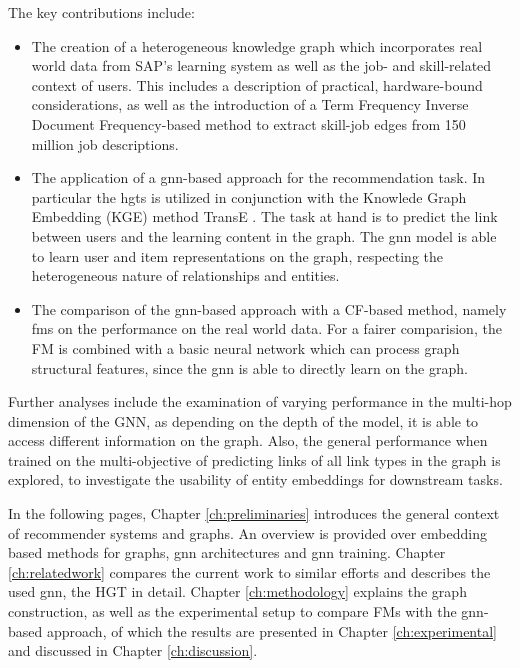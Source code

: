 \newpage
The key contributions include:
\begin{itemize}
\item The creation of a heterogeneous knowledge graph which incorporates real world data from SAP's learning system as well as the job- and skill-related context of users. This includes a description of practical, hardware-bound considerations, as well as the introduction of a Term Frequency Inverse Document Frequency-based method to extract skill-job edges from 150 million job descriptions.
\item The application of a \ac{gnn}-based approach for the recommendation task. In particular the \acp{hgt} \parencite{hu2020heterogeneous} is utilized in conjunction with the Knowlede Graph Embedding (KGE) method TransE \parencite{bordes2013translating}. The task at hand is to predict the link between users and the learning content in the graph. The \ac{gnn} model is able to learn user and item representations on the graph, respecting the heterogeneous nature of relationships and entities.
\item The comparison of the \ac{gnn}-based approach with a CF-based method, namely \acp{fm} \parencite{rendle2010factorization} on the performance on the real world data. For a fairer comparision, the FM is combined with a basic neural network which can process graph structural features, since the \ac{gnn} is able to directly learn on the graph.



\end{itemize}

Further analyses include the examination of varying performance in the multi-hop dimension of the GNN, as depending on the depth of the model, it is able to access different information on the graph. 
Also, the general performance when trained on the multi-objective of predicting links of all link types in the graph is explored, to investigate the usability of entity embeddings for downstream tasks.

In the following pages, Chapter \ref{ch:preliminaries} introduces the general context of recommender systems and graphs. An overview is provided over embedding based methods for graphs, \ac{gnn} architectures and \ac{gnn} training. Chapter \ref{ch:relatedwork} compares the current work to similar efforts and describes the used \ac{gnn}, the HGT in detail. Chapter \ref{ch:methodology} explains the graph construction, as well as the experimental setup to compare FMs with the \ac{gnn}-based approach, of which the results are presented in Chapter \ref{ch:experimental} and discussed in Chapter \ref{ch:discussion}.

